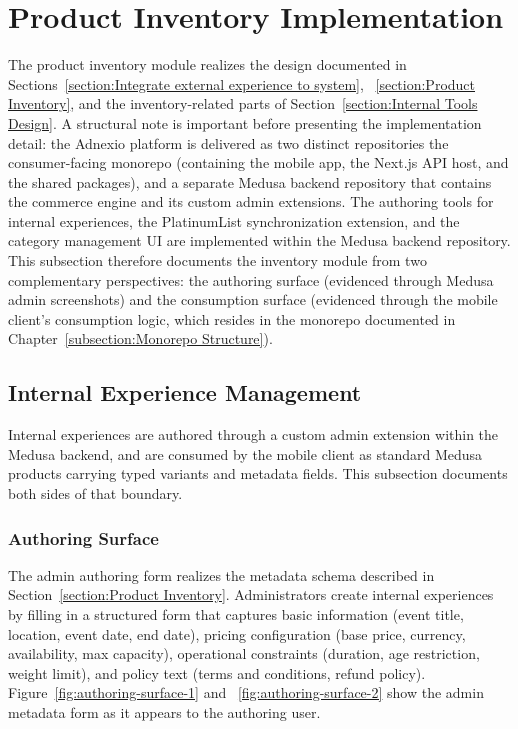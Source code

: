 \section{Product Inventory Implementation}
The product inventory module realizes the design documented in Sections~\ref{section:Integrate external experience to system}, ~\ref{section:Product Inventory}, and the inventory-related parts of Section~\ref{section:Internal Tools Design}. A structural note is important before presenting the implementation detail: the Adnexio platform is delivered as two distinct repositories the consumer-facing monorepo (containing the mobile app, the Next.js API host, and the shared packages), and a separate Medusa backend repository that contains the commerce engine and its custom admin extensions. The authoring tools for internal experiences, the PlatinumList synchronization extension, and the category management UI are implemented within the Medusa backend repository. This subsection therefore documents the inventory module from two complementary perspectives: the authoring surface (evidenced through Medusa admin screenshots) and the consumption surface (evidenced through the mobile client's consumption logic, which resides in the monorepo documented in Chapter~\ref{subsection:Monorepo Structure}).

\subsection{Internal Experience Management}
Internal experiences are authored through a custom admin extension within the Medusa backend, and are consumed by the mobile client as standard Medusa products carrying typed variants and metadata fields. This subsection documents both sides of that boundary.

\subsubsection{Authoring Surface}
The admin authoring form realizes the metadata schema described in Section~\ref{section:Product Inventory}. Administrators create internal experiences by filling in a structured form that captures basic information (event title, location, event date, end date), pricing configuration (base price, currency, availability, max capacity), operational constraints (duration, age restriction, weight limit), and policy text (terms and conditions, refund policy). Figure~\ref{fig:authoring-surface-1} and ~\ref{fig:authoring-surface-2} show the admin metadata form as it appears to the authoring user.

